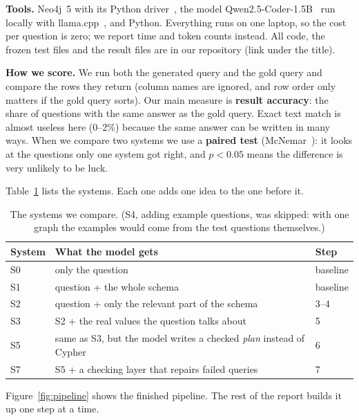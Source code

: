 \documentclass[11pt,a4paper]{article}
\begin{document}
\textbf{Tools.} Neo4j~5 with its Python driver~\cite{neo4jdriver}, the model
Qwen2.5-Coder-1.5B~\cite{qwen} run locally with llama.cpp~\cite{llamacpp}, and Python. Everything runs on one laptop, so the cost per
question is zero; we report time and token counts instead. All code, the frozen test files
and the result files are in our repository (link under the title).

\textbf{How we score.} We run both the generated query and the gold query and compare the
rows they return (column names are ignored, and row order only matters if the gold query
sorts). Our main measure is \textbf{result accuracy}: the share of questions with the
same answer as the gold query. Exact text match is almost useless here (0--2\%) because
the same answer can be written in many ways. When we compare two systems we use a
\textbf{paired test} (McNemar~\cite{mcnemar}): it looks at the questions only one system
got right, and $p<0.05$ means the difference is very unlikely to be luck.

Table~\ref{tab:systems} lists the systems. Each one adds one idea to the one before it.

\begin{table}[h]
\centering\small
\begin{tabular}{@{}lll@{}}
\toprule
System & What the model gets & Step \\
\midrule
S0 & only the question & baseline \\
S1 & question + the whole schema & baseline \\
S2 & question + only the relevant part of the schema & 3--4 \\
S3 & S2 + the real values the question talks about & 5 \\
S5 & same as S3, but the model writes a checked \emph{plan} instead of Cypher & 6 \\
S7 & S5 + a checking layer that repairs failed queries & 7 \\
\bottomrule
\end{tabular}
\caption{The systems we compare. (S4, adding example questions, was skipped: with one
graph the examples would come from the test questions themselves.)}
\label{tab:systems}
\end{table}

Figure~\ref{fig:pipeline} shows the finished pipeline. The rest of the report builds it up
one step at a time.
\end{document}
